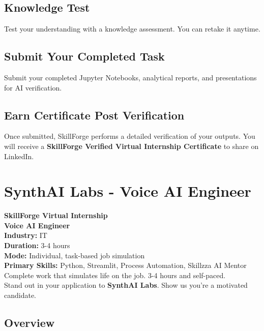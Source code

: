 \documentclass{article}
\begin{document}
\subsection*{Knowledge Test}
Test your understanding with a knowledge assessment. You can retake it anytime.\\

\subsection*{Submit Your Completed Task}
Submit your completed Jupyter Notebooks, analytical reports, and presentations for AI verification.\\

\subsection*{Earn Certificate Post Verification}
Once submitted, SkillForge performs a detailed verification of your outputs. You will receive a \textbf{SkillForge Verified Virtual Internship Certificate} to share on LinkedIn.\\

\newpage

\section{SynthAI Labs - Voice AI Engineer}

\textbf{SkillForge Virtual Internship} \\
\textbf{Voice AI Engineer} \\

\textbf{Industry:} IT \\
\textbf{Duration:} 3-4 hours \\
\textbf{Mode:} Individual, task-based job simulation \\
\textbf{Primary Skills:} Python, Streamlit, Process Automation, Skillzza AI Mentor \\

Complete work that simulates life on the job. 3-4 hours and self-paced. \\
Stand out in your application to \textbf{SynthAI Labs}. Show us you're a motivated candidate. \\

\subsection*{Overview}
\end{document}
